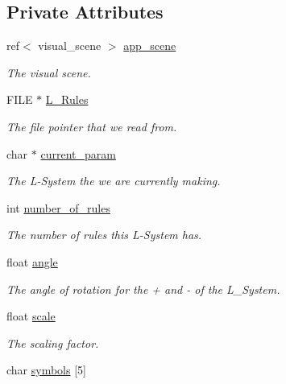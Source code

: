\subsection*{Private Attributes}
\begin{DoxyCompactItemize}
\item 
ref$<$ visual\+\_\+scene $>$ \hyperlink{classoctet_1_1_maths___l___systems_aca3393864ce7f6347a7d45eac2f21950}{app\+\_\+scene}
\begin{DoxyCompactList}\small\item\em The visual scene. \end{DoxyCompactList}\item 
F\+I\+L\+E $\ast$ \hyperlink{classoctet_1_1_maths___l___systems_a8a58838e93bde57d4d7b1a35cef6e4f2}{L\+\_\+\+Rules}
\begin{DoxyCompactList}\small\item\em The file pointer that we read from. \end{DoxyCompactList}\item 
char $\ast$ \hyperlink{classoctet_1_1_maths___l___systems_a49d998a086a775f7ae692be076e5175d}{current\+\_\+param}
\begin{DoxyCompactList}\small\item\em The L-\/\+System the we are currently making. \end{DoxyCompactList}\item 
int \hyperlink{classoctet_1_1_maths___l___systems_af66610095ffa2515df4b7a821783792d}{number\+\_\+of\+\_\+rules}
\begin{DoxyCompactList}\small\item\em The number of rules this L-\/\+System has. \end{DoxyCompactList}\item 
float \hyperlink{classoctet_1_1_maths___l___systems_a0b97e0018e7e59be5d0e8c268ed85a68}{angle}
\begin{DoxyCompactList}\small\item\em The angle of rotation for the + and -\/ of the L\+\_\+\+System. \end{DoxyCompactList}\item 
float \hyperlink{classoctet_1_1_maths___l___systems_a3baf90aa95cd3c535fba893641f0cd1e}{scale}
\begin{DoxyCompactList}\small\item\em The scaling factor. \end{DoxyCompactList}\item 
char \hyperlink{classoctet_1_1_maths___l___systems_acd98087b379a1b860b1631a6224470e9}{symbols} \mbox{[}5\mbox{]}

\end{DoxyCompactItemize}
